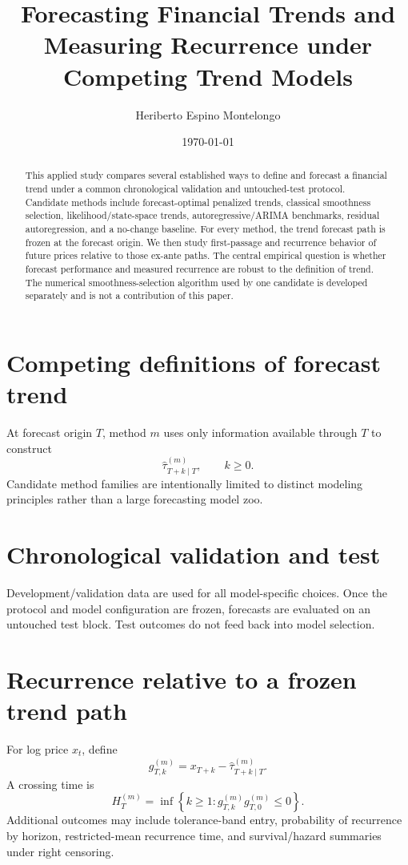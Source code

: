 \documentclass[11pt]{article}
\title{Forecasting Financial Trends and Measuring Recurrence under Competing Trend Models}
\author{Heriberto Espino Montelongo}
\date{\today}
\begin{document}
\maketitle

\begin{abstract}
This applied study compares several established ways to define and forecast a
financial trend under a common chronological validation and untouched-test
protocol. Candidate methods include forecast-optimal penalized trends,
classical smoothness selection, likelihood/state-space trends,
autoregressive/ARIMA benchmarks, residual autoregression, and a no-change
baseline. For every method, the trend forecast path is frozen at the forecast
origin. We then study first-passage and recurrence behavior of future prices
relative to those ex-ante paths. The central empirical question is whether
forecast performance and measured recurrence are robust to the definition of
trend. The numerical smoothness-selection algorithm used by one candidate is
developed separately and is not a contribution of this paper.
\end{abstract}

\section{Competing definitions of forecast trend}

At forecast origin $T$, method $m$ uses only information available through
$T$ to construct
\[
\widehat\tau^{(m)}_{T+k\mid T},
\qquad k\ge0.
\]
Candidate method families are intentionally limited to distinct modeling
principles rather than a large forecasting model zoo.

\section{Chronological validation and test}

Development/validation data are used for all model-specific choices. Once the
protocol and model configuration are frozen, forecasts are evaluated on an
untouched test block. Test outcomes do not feed back into model selection.

\section{Recurrence relative to a frozen trend path}

For log price $x_t$, define
\[
g^{(m)}_{T,k}
=
x_{T+k}
-
\widehat\tau^{(m)}_{T+k\mid T}.
\]
A crossing time is
\[
H_T^{(m)}
=
\inf\left\{
k\ge1:
g^{(m)}_{T,k}g^{(m)}_{T,0}\le0
\right\}.
\]
Additional outcomes may include tolerance-band entry, probability of
recurrence by horizon, restricted-mean recurrence time, and survival/hazard
summaries under right censoring.
\end{document}
